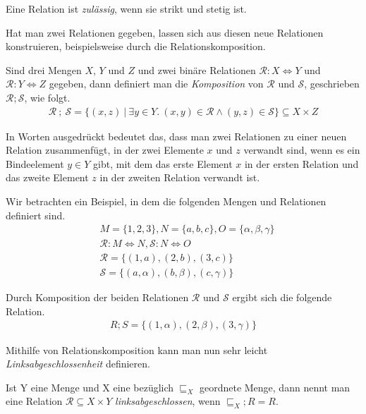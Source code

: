\begin{mydef}
Eine Relation ist \textit{zulässig}, wenn sie strikt und stetig ist.
\end{mydef}

Hat man zwei Relationen gegeben, lassen sich aus diesen neue Relationen konstruieren, beispielsweise durch die Relationskomposition.

\begin{mydef}
Sind drei Mengen $X$, $Y$ und $Z$ und zwei binäre Relationen $\mathcal{R} : X \Leftrightarrow Y$ und $\mathcal{R} : Y
\Leftrightarrow Z$ gegeben, dann definiert man die \textit{Komposition} von $\mathcal{R}$ und $\mathcal{S}$,
geschrieben $\mathcal{R} ; \mathcal{S}$, wie folgt.
\begin{align*}
\mathcal{R} ~;~ \mathcal{S} = \{ (x, z) ~|~ \exists y \in Y .~ (x, y) \in \mathcal{R} \wedge (y, z) \in \mathcal{S} \} \subseteq X \times Z
\end{align*}
\end{mydef}

In Worten ausgedrückt bedeutet das, dass man zwei Relationen zu einer neuen Relation zusammenfügt, in der zwei Elemente
$x$ und $z$ verwandt sind, wenn es ein Bindeelement $y \in Y$ gibt, mit dem das erste Element $x$ in der ersten Relation und das
zweite Element $z$ in der zweiten Relation verwandt ist.

Wir betrachten ein Beispiel, in dem die folgenden Mengen und Relationen definiert sind.
\begin{align*}
&M = \{ 1, 2, 3 \}, N = \{ a, b, c \}, O = \{ \alpha, \beta, \gamma \} \\
&\mathcal{R} : M \Leftrightarrow N, \mathcal{S} : N \Leftrightarrow O \\
&\mathcal{R} = \{ (1, a), (2, b), (3, c) \} \\
&\mathcal{S} = \{ (a, \alpha), (b, \beta), (c, \gamma) \}
\end{align*}

Durch Komposition der beiden Relationen $\mathcal{R}$ und $\mathcal{S}$ ergibt sich die folgende Relation.
\begin{align*}
R ; S = \{ (1, \alpha), (2, \beta), (3, \gamma) \}
\end{align*}

Mithilfe von Relationskomposition kann man nun sehr leicht \textit{Linksabgeschlossenheit} definieren.

\begin{mydef}
Ist Y eine Menge und X eine bezüglich $\sqsubseteq_{X}$ geordnete Menge, dann nennt man eine Relation $\mathcal{R} \subseteq X \times Y$ \textit{linksabgeschlossen}, wenn $\sqsubseteq_{X} ; R = R$.
\end{mydef}

